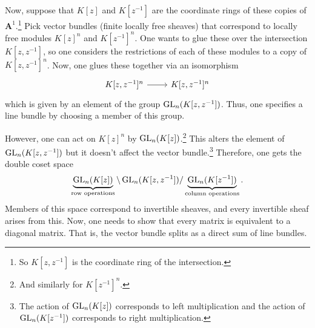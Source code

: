 \documentclass [11 pt, oneside] {article}
\begin{document}
Now, suppose that $K[z]$ and $K[z^{-1}]$ are the coordinate rings of these copies of $\mathbf{A}^1$.\footnote{So $K[z,z^{-1}]$ is the coordinate ring of the intersection.} Pick vector bundles (finite locally free sheaves) that correspond to locally free modules $K[z]^n$ and $K[z^{-1}]^n$. One wants to glue these over the intersection $K[z,z^{-1}]$, so one considers the restrictions of each of these modules to a copy of $K[z,z^{-1}]^n$. Now, one glues these together via an isomorphism 
\[
\begin{tikzcd}
K[z,z^{-1}]^n\ar[r]& K[z,z^{-1}]^n
\end{tikzcd}
\]
which is given by an element of the group $\operatorname{GL}_{n}(K[z,z^{-1}])$. Thus, one specifies a line bundle by choosing a member of this group.

However, one can act on $K[z]^n$ by $\operatorname{GL}_{n}(K[z])$.\footnote{And similarly for $K[z^{-1}]^n$.} This alters the element of $\operatorname{GL}_{n}(K[z,z^{-1}])$ but it doesn't affect the vector bundle.\footnote{The action of $\operatorname{GL}_{n}(K[z])$ corresponds to left multiplication and the action of $\operatorname{GL}_{n}(K[z^{-1}])$ corresponds to right multiplication.} Therefore, one gets the double coset space 
\begin{align*}
	\underbrace{\operatorname{GL}_{n}(K[z])}_{\textrm{row operations}}\backslash  \operatorname{GL}_{n}(K[z,z^{-1}]) / \underbrace{\operatorname{GL}_{n}(K[z^{-1}])}_{\textrm{column operations}}.
\end{align*}
Members of this space correspond to invertible sheaves, and every invertible sheaf arises from this. Now, one needs to show that every matrix is equivalent to a diagonal matrix. That is, the vector bundle splits as a direct sum of line bundles.
\end{document}

